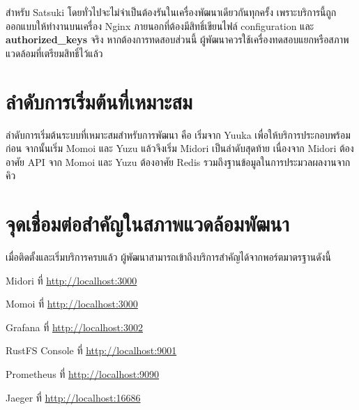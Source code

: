 \begin{figure}[htbp]
\centering
{}
\caption{}
\label{figG:StartYuzu}
\end{figure}

\begin{figure}[htbp]
\centering
{}
\caption{}
\label{figG:StartMidori}
\end{figure}

\hspace*{1.3em}
สำหรับ Satsuki โดยทั่วไปจะไม่จำเป็นต้องรันในเครื่องพัฒนาเดียวกันทุกครั้ง เพราะบริการนี้ถูกออกแบบให้ทำงานบนเครื่อง Nginx ภายนอกที่ต้องมีสิทธิ์เขียนไฟล์ configuration และ \textbf{authorized\_keys} จริง หากต้องการทดสอบส่วนนี้ ผู้พัฒนาควรใช้เครื่องทดสอบแยกหรือสภาพแวดล้อมที่เตรียมสิทธิ์ไว้แล้ว

\section{ลำดับการเริ่มต้นที่เหมาะสม}
\hspace*{1.3em}
ลำดับการเริ่มต้นระบบที่เหมาะสมสำหรับการพัฒนา คือ เริ่มจาก Yuuka เพื่อให้บริการประกอบพร้อมก่อน จากนั้นเริ่ม Momoi และ Yuzu แล้วจึงเริ่ม Midori เป็นลำดับสุดท้าย เนื่องจาก Midori ต้องอาศัย API จาก Momoi และ Yuzu ต้องอาศัย Redis รวมถึงฐานข้อมูลในการประมวลผลงานจากคิว

\section{จุดเชื่อมต่อสำคัญในสภาพแวดล้อมพัฒนา}
\hspace*{1.3em}
เมื่อติดตั้งและเริ่มบริการครบแล้ว ผู้พัฒนาสามารถเข้าถึงบริการสำคัญได้จากพอร์ตมาตรฐานดังนี้

\begin{mycustomenum2}
    \item Midori ที่ \url{http://localhost:3000}
    \item Momoi ที่ \url{http://localhost:3000}
    \item Grafana ที่ \url{http://localhost:3002}
    \item RustFS Console ที่ \url{http://localhost:9001}
    \item Prometheus ที่ \url{http://localhost:9090}
    \item Jaeger ที่ \url{http://localhost:16686}
\end{mycustomenum2}

